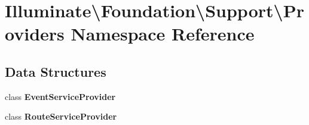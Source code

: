 \section{Illuminate\textbackslash{}Foundation\textbackslash{}Support\textbackslash{}Providers Namespace Reference}
\label{namespace_illuminate_1_1_foundation_1_1_support_1_1_providers}
\subsection*{Data Structures}
\begin{DoxyCompactItemize}
\item 
class {\bf Event\+Service\+Provider}
\item 
class {\bf Route\+Service\+Provider}
\end{DoxyCompactItemize}
